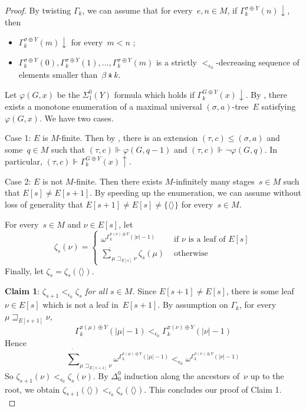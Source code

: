 \documentclass{article}
\numberwithin{theorem}{section}
\newcommand{\ntimes}{\dottimes}
\newcommand{\nsum}{\dot{\sum}}
\begin{document}
\begin{proof}
By twisting $\Gamma_k$, we can assume that for every~$e, n \in M$, if $\Gamma^{\sigma \oplus Y}_k(n)\downarrow$, then
\begin{itemize}
    \item $\Gamma^{\sigma \oplus Y}_k(m)\downarrow$ for every~$m < n$ ;
    \item $\Gamma^{\sigma \oplus Y}_k(0), \Gamma^{\sigma \oplus Y}_k(1), \dots, \Gamma^{\sigma \oplus Y}_k(m)$ is a strictly $<_{\epsilon_0}$-decreasing sequence of elements smaller than~$\beta \ntimes k$.
\end{itemize}


Let $\varphi(G, x)$ be the $\Sigma^0_1(Y)$ formula which holds if $\Gamma^{G \oplus Y}_k(x)\downarrow$.
By , there exists a monotone enumeration of a maximal universal $(\sigma, a)$-tree~$E$ satisfying $\varphi(G, x)$. We have two cases.

Case 1: $E$ is $M$-finite. Then by , there is an extension $(\tau, c) \leq (\sigma, a)$ and some~$q \in M$ such that $(\tau, c) \Vdash \varphi(G, q-1)$ and $(\tau, c) \Vdash \neg \varphi(G, q)$. In particular, $(\tau, c) \Vdash \Gamma^{G \oplus Y}_k(x)\uparrow$.

Case 2: $E$ is not $M$-finite. Then there exists $M$-infinitely many stages~$s \in M$ such that $E[s] \neq E[s+1]$.
By speeding up the enumeration, we can assume without loss of generality that $E[s+1] \neq E[s] \neq \{\langle\rangle\}$ for every~$s \in M$.

For every~$s \in M$ and $\nu \in E[s]$, let
$$\zeta_s(\nu) = \left\{ \begin{array}{ll}
    \omega^{\Gamma_k^{\pi(\nu) \oplus Y}(|\nu|-1)} & \mbox{ if } \nu \mbox{ is a leaf of } E[s]\\
    \nsum_{\mu \sqsupset_{E[s]} \nu} \zeta_s(\mu) & \mbox{ otherwise }
\end{array}\right.
$$
Finally, let $\zeta_s = \zeta_s(\langle\rangle)$.
\bigskip



\textbf{Claim 1}: \emph{$\zeta_{s+1} <_{\epsilon_0} \zeta_s$ for all $s \in M$.}
Since $E[s+1] \neq E[s]$, there is some leaf~$\nu \in E[s]$ which is not a leaf in~$E[s+1]$.
By assumption on $\Gamma_k$, for every~$\mu \sqsupseteq_{E[s+1]} \nu$,
$$
\Gamma_k^{\pi(\mu) \oplus Y}(|\mu|-1) <_{\epsilon_0} \Gamma_k^{\pi(\nu) \oplus Y}(|\nu|-1)
$$
Hence
$$
\nsum_{\mu \sqsupset_{E[s+1]} \nu} \omega^{\Gamma_k^{\pi(\mu) \oplus Y}(|\mu|-1)} <_{\epsilon_0} \omega^{\Gamma_k^{\pi(\nu) \oplus Y}(|\nu|-1)}
$$
So $\zeta_{s+1}(\nu) <_{\epsilon_0} \zeta_s(\nu)$. By $\Delta^0_0$ induction along the ancestors of~$\nu$ up to the root, we obtain $\zeta_{s+1}(\langle\rangle) <_{\epsilon_0} \zeta_s(\langle\rangle)$. This concludes our proof of Claim 1.\\


\end{proof}
\end{document}
